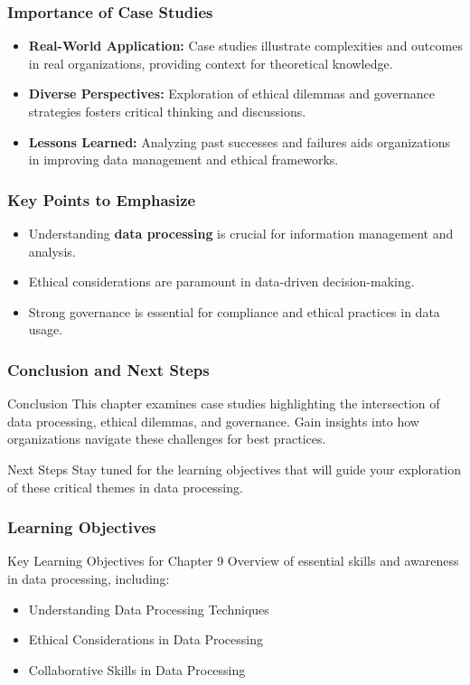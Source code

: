\documentclass[aspectratio=169]{beamer}
\begin{document}
\begin{frame}[fragile]
    \frametitle{Importance of Case Studies}
    \begin{itemize}
        \item \textbf{Real-World Application:} Case studies illustrate complexities and outcomes in real organizations, providing context for theoretical knowledge.
        \item \textbf{Diverse Perspectives:} Exploration of ethical dilemmas and governance strategies fosters critical thinking and discussions.
        \item \textbf{Lessons Learned:} Analyzing past successes and failures aids organizations in improving data management and ethical frameworks.
    \end{itemize}
\end{frame}

\begin{frame}[fragile]
    \frametitle{Key Points to Emphasize}
    \begin{itemize}
        \item Understanding \textbf{data processing} is crucial for information management and analysis.
        \item Ethical considerations are paramount in data-driven decision-making.
        \item Strong governance is essential for compliance and ethical practices in data usage.
    \end{itemize}
\end{frame}

\begin{frame}[fragile]
    \frametitle{Conclusion and Next Steps}
    \begin{block}{Conclusion}
        This chapter examines case studies highlighting the intersection of data processing, ethical dilemmas, and governance. Gain insights into how organizations navigate these challenges for best practices.
    \end{block}

    \begin{block}{Next Steps}
        Stay tuned for the learning objectives that will guide your exploration of these critical themes in data processing.
    \end{block}
\end{frame}

\begin{frame}[fragile]
    \frametitle{Learning Objectives}
    \begin{block}{Key Learning Objectives for Chapter 9}
        Overview of essential skills and awareness in data processing, including:
    \end{block}
    \begin{itemize}
        \item Understanding Data Processing Techniques
        \item Ethical Considerations in Data Processing
        \item Collaborative Skills in Data Processing
    \end{itemize}
\end{frame}
\end{document}
